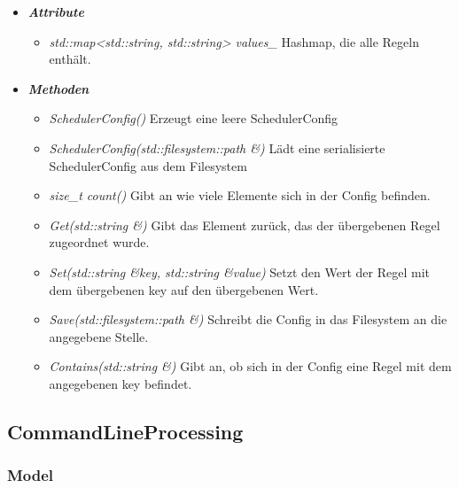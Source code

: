 \documentclass[a4paper,12pt]{article}
\begin{document}
\begin{itemize}[label={}]

	\item \textit{\textbf{Attribute}}
		\begin{itemize}[label={\textbullet}]
			\item \textit{std::map<std::string, std::string> values\_} Hashmap, die alle Regeln enthält.
		\end{itemize}

	\item \textit{\textbf{Methoden}}
		\begin{itemize}[label={\textbullet}]
			\item \textit{SchedulerConfig()} Erzeugt eine leere SchedulerConfig
			\item \textit{SchedulerConfig(std::filesystem::path \&)} Lädt eine serialisierte SchedulerConfig aus dem Filesystem
			\item \textit{size\_t count()} Gibt an wie viele Elemente sich in der Config befinden.
			\item \textit{Get(std::string \&)} Gibt das Element zurück, das der übergebenen Regel zugeordnet wurde.
			\item \textit{Set(std::string \&key, std::string \&value)} Setzt den Wert der Regel mit dem übergebenen key auf den übergebenen Wert.
			\item \textit{Save(std::filesystem::path \&)} Schreibt die Config in das Filesystem an die angegebene Stelle.
			\item \textit{Contains(std::string \&)} Gibt an, ob sich in der Config eine Regel mit dem angegebenen key befindet.
		\end{itemize}


\end{itemize}
\clearpage
\subsection{CommandLineProcessing}

\subsubsection{Model}
\end{document}
